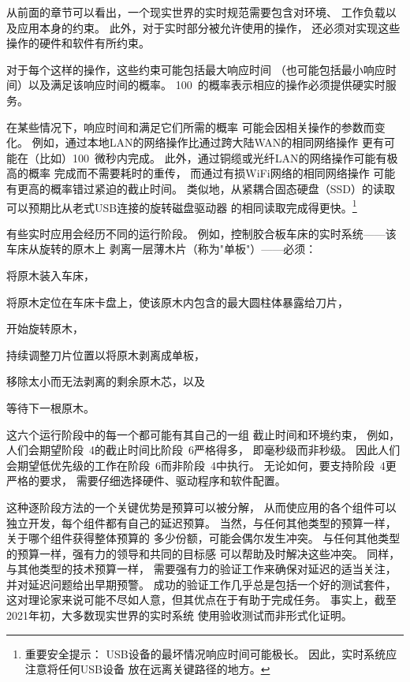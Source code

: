 从前面的章节可以看出，一个现实世界的实时规范需要包含对环境、
工作负载以及应用本身的约束。
此外，对于实时部分被允许使用的操作，
还必须对实现这些操作的硬件和软件有所约束。

对于每个这样的操作，这些约束可能包括最大响应时间
（也可能包括最小响应时间）以及满足该响应时间的概率。
100\pct\ 的概率表示相应的操作必须提供硬实时服务。

在某些情况下，响应时间和满足它们所需的概率
可能会因相关操作的参数而变化。
例如，通过本地LAN的网络操作比通过跨大陆WAN的相同网络操作
更有可能在（比如）100~微秒内完成。\@
此外，通过铜缆或光纤LAN的网络操作可能有极高的概率
完成而不需要耗时的重传，
而通过有损WiFi网络的相同网络操作
可能有更高的概率错过紧迫的截止时间。
类似地，从紧耦合固态硬盘（SSD）的读取
可以预期比从老式USB连接的旋转磁盘驱动器
的相同读取完成得更快。\footnote{
	重要安全提示：
	USB设备的最坏情况响应时间可能极长。
	因此，实时系统应注意将任何USB设备
	放在远离关键路径的地方。}

有些实时应用会经历不同的运行阶段。
例如，控制胶合板车床的实时系统——该车床从旋转的原木上
剥离一层薄木片（称为"单板"）——必须：
\begin{enumerate*}[(1)]
\item 将原木装入车床，
\item 将原木定位在车床卡盘上，使该原木内包含的最大圆柱体暴露给刀片，
\item 开始旋转原木，
\item 持续调整刀片位置以将原木剥离成单板，
\item 移除太小而无法剥离的剩余原木芯，以及
\item 等待下一根原木。
\end{enumerate*}
这六个运行阶段中的每一个都可能有其自己的一组
截止时间和环境约束，
例如，人们会期望阶段~4的截止时间比阶段~6严格得多，
即毫秒级而非秒级。
因此人们会期望低优先级的工作在阶段~6而非阶段~4中执行。
无论如何，要支持阶段~4更严格的要求，
需要仔细选择硬件、驱动程序和软件配置。

这种逐阶段方法的一个关键优势是预算可以被分解，
从而使应用的各个组件可以独立开发，每个组件都有自己的延迟预算。
当然，与任何其他类型的预算一样，关于哪个组件获得整体预算的
多少份额，可能会偶尔发生冲突。
与任何其他类型的预算一样，强有力的领导和共同的目标感
可以帮助及时解决这些冲突。
同样，与其他类型的技术预算一样，
需要强有力的验证工作来确保对延迟的适当关注，
并对延迟问题给出早期预警。
成功的验证工作几乎总是包括一个好的测试套件，
这对理论家来说可能不尽如人意，但其优点在于有助于完成任务。
事实上，截至2021年初，大多数现实世界的实时系统
使用验收测试而非形式化证明。

